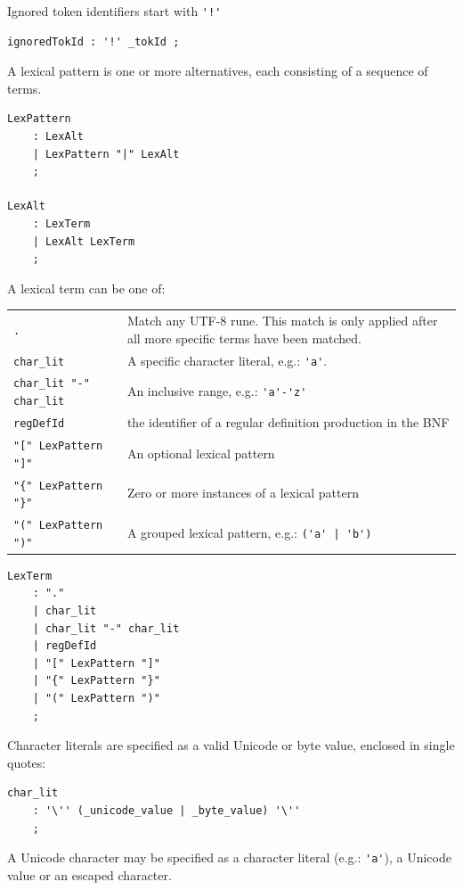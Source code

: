 \documentclass[12pt]{article}
\begin{document}
Ignored token identifiers start with \verb|'!'|

\begin{Verbatim}[frame=single]
ignoredTokId : '!' _tokId ;
\end{Verbatim}

A lexical pattern is one or more alternatives, each consisting of a sequence of terms.

\begin{Verbatim}[frame=single]
LexPattern
    : LexAlt
    | LexPattern "|" LexAlt
    ;

LexAlt
    : LexTerm
    | LexAlt LexTerm
    ;
\end{Verbatim}

A lexical term can be one of:

\begin{longtable}{lp{12cm}}
	\verb|.| & Match any UTF-8 rune. This match is only applied after all more specific terms have been matched. \\
	\verb|char_lit| & A specific character literal, e.g.: \verb|'a'|. \\
	\verb|char_lit "-" char_lit| & An inclusive range, e.g.: \verb|'a'-'z'| \\
	\verb|regDefId| & the identifier of a regular definition production in the BNF \\
	\verb|"[" LexPattern "]"| & An optional lexical pattern \\
	\verb|"{" LexPattern "}"| & Zero or more instances of a lexical pattern \\
	\verb|"(" LexPattern ")"| & A grouped lexical pattern, e.g.: \verb+('a' | 'b')+ \\
\end{longtable}

\begin{Verbatim}[frame=single]
LexTerm
    : "."
    | char_lit
    | char_lit "-" char_lit
    | regDefId
    | "[" LexPattern "]"
    | "{" LexPattern "}"
    | "(" LexPattern ")"
    ;
\end{Verbatim}

Character literals are specified as a valid Unicode or byte value, enclosed in single quotes:

\begin{Verbatim}[frame=single]
char_lit
    : '\'' (_unicode_value | _byte_value) '\''
    ;
\end{Verbatim}

A Unicode character may be specified as a character literal (e.g.: \verb|'a'|), a Unicode value or an escaped character.
\end{document}
